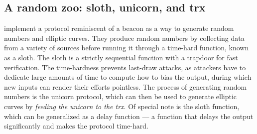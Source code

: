 \subsection{A random zoo: sloth, unicorn, and trx}%
\label{sub:random_zoo}
\citet{randomzoo} implement a protocol reminiscent of a beacon as a way to generate random numbers and elliptic curves.
They produce random numbers by collecting data from a variety of sources before running it through a time-hard function, known as a sloth.
The sloth is a strictly sequential function with a trapdoor for fast verification.
The time-hardness prevents last-draw attacks, as attackers have to dedicate large amounts of time to compute how to bias the output, during which new inputs can render their efforts pointless.
The process of generating random numbers is the unicorn protocol, which can then be used to generate elliptic curves by  \textit{feeding the unicorn to the trx}.
Of special note is the sloth function, which can be generalized as a delay function --- a function that delays the output significantly and makes the protocol time-hard.
